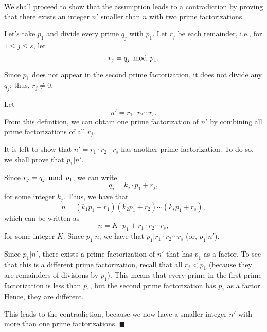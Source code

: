 \begin{frame}
  \begin{tcolorbox}[title=Proof (cont.)]
  We shall proceed to show that the assumption leads to a
  contradiction by proving that there exists an integer $n'$ smaller
  than $n$ with two prime factorizations.

  Let's take $p_1$ and divide every prime $q_j$ with $p_1$.  Let $r_j$
  be each remainder, i.e., for $1\leq j\leq s$, let
  \[ r_j=q_j \,\bmod\, p_1.\]

  Since $p_1$ does not appear in the second prime factorization, it
  does not divide any $q_j$; thus, $r_j\neq 0$.
  
  Let
  \[ n' = r_1\cdot r_2\cdots r_s.\]
  From this definition, we can obtain one prime factorization of $n'$
  by combining all prime factorizations of all $r_j$.
  \end{tcolorbox}
\end{frame}

\begin{frame}
  \begin{tcolorbox}[title=Proof (cont.)]
  It is left to show that $n'=r_1\cdot r_2\cdots r_s$ has another
  prime factorization.  To do so, we shall prove that $p_1|n'$.

  \vspace{0.1in}
  Since $r_j=q_j\,\bmod\, p_1$, we can write
  \[ q_j=k_j\cdot p_1 + r_j, \]
  for some integer $k_j$.  Thus, we have that
  \[ n = (k_1p_1+r_1)(k_2p_1+r_2)\cdots(k_sp_1+r_s), \]
  which can be written as
  \[ n = K\cdot p_1 + r_1\cdot r_2\cdots r_s, \]
  for some integer $K$.  Since $p_1|n$, we have that $p_1|r_1\cdot
  r_2\cdots r_s$ (or, $p_1|n'$).
  \end{tcolorbox}
\end{frame}

\begin{frame}
  \begin{tcolorbox}[title=Proof (cont.)]
  Since $p_1|n'$, there exists a prime factorization of $n'$ that has
  $p_1$ as a factor.  To see that this is a different prime
  factorization, recall that all $r_j < p_1$ (because they are
  remainders of divisions by $p_1$).  This means that every prime in
  the first prime factorization is less than $p_1$, but the second
  prime factorization has $p_1$ as a factor.  Hence, they are
  different.

  \vspace{0.1in} This leads to the contradiction, because we now have
  a smaller integer $n'$ with more than one prime
  factorizations. $\blacksquare$
  \end{tcolorbox}
\end{frame}

